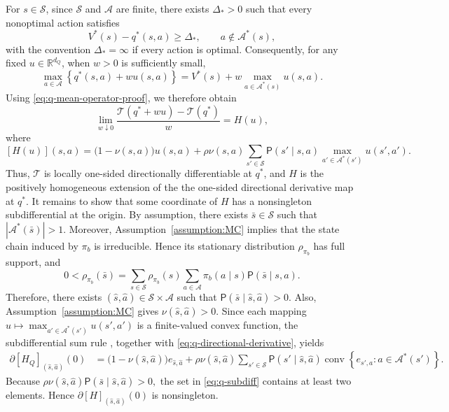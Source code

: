\documentclass[11pt,letterpaper]{article}
\theoremstyle{plain}
\theoremstyle{definition}
\theoremstyle{remark}
\newcommand{\mS}{\mathcal{S}}
\newcommand{\mA}{\mathcal{A}}
\newcommand{\mT}{\mathcal{T}}
\newcommand{\R}{\mathbb{R}}
\begin{document}
For \(s\in\mS\), since \(\mS\) and \(\mA\) are finite, there exists
\(\Delta_*>0\) such that every nonoptimal action satisfies
\[
    V^*(s)-q^*(s,a)\geq\Delta_*,
    \qquad
    a\notin\mA^*(s),
\]
with the convention \(\Delta_*=\infty\) if every action is optimal.
Consequently, for any fixed \(u\in\R^{d_Q}\), when \(w>0\) is sufficiently small,
\[
    \max_{a\in\mA}
    \left\{
        q^*(s,a)+wu(s,a)
    \right\}
    =
    V^*(s)
    +
    w\max_{a\in\mA^*(s)}u(s,a).
\]
Using \eqref{eq:q-mean-operator-proof}, we therefore obtain
\[
    \lim_{w\downarrow0}
    \frac{\mT(q^*+wu)-\mT(q^*)}{w}
    =
    H(u),
\]
where
\begin{equation}
\label{eq:q-directional-derivative}
    [H(u)](s,a)
    =
    \bigl(1-\nu(s,a)\bigr)u(s,a) 
    +
    \rho\nu(s,a)
    \sum_{s'\in\mS}
    \mathsf P(s'\mid s,a)
    \max_{a'\in\mA^*(s')}u(s',a').
\end{equation}
Thus, \(\mT\) is locally one-sided directionally differentiable at \(q^*\),
and \(H\) is the positively homogeneous extension of the the one-sided
directional derivative map at \(q^*\). It remains to show that some coordinate of \(H\) has a nonsingleton
subdifferential at the origin. By assumption, there exists
\(\bar s\in\mS\) such that $|\mA^*(\bar s)|>1.$ Moreover, Assumption~\ref{assumption:MC} implies that the state chain induced
by \(\pi_b\) is irreducible. Hence its stationary distribution
\(\rho_{\pi_b}\) has full support, and
\[
    0
    <
    \rho_{\pi_b}(\bar s)
    =
    \sum_{s\in\mS}
    \rho_{\pi_b}(s)
    \sum_{a\in\mA}
    \pi_b(a\mid s)
    \mathsf P(\bar s\mid s,a).
\]
Therefore, there exists
\((\hat s,\hat a)\in\mS\times\mA\) such that $\mathsf P(\bar s\mid\hat s,\hat a)>0.$ Also, Assumption~\ref{assumption:MC} gives $\nu(\hat s,\hat a)>0.$ Since each mapping $u
    \mapsto
    \max_{a'\in\mA^*(s')}u(s',a')$ is a finite-valued convex function, the subdifferential sum rule
\cite{rockafellar2015convex}, together with
\eqref{eq:q-directional-derivative}, yields
\begin{align}
    \partial [H_Q]_{(\hat s,\hat a)}(0)
    &=
    \bigl(1-\nu(\hat s,\hat a)\bigr)e_{\hat s,\hat a}
    +
    \rho\nu(\hat s,\hat a)
    \sum_{s'\in\mS}
    \mathsf P(s'\mid\hat s,\hat a)
    \operatorname{conv}
    \left\{
        e_{s',a}:a\in\mA^*(s')
    \right\}.
    \label{eq:q-subdiff}
\end{align}
Because $\rho\nu(\hat s,\hat a)
    \mathsf P(\bar s\mid\hat s,\hat a)>0,$ the set in \eqref{eq:q-subdiff} contains at least two elements. Hence $\partial [H]_{(\hat s,\hat a)}(0)$ is nonsingleton.
\end{document}
